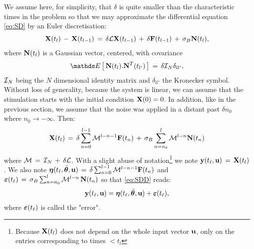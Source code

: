\documentclass{article}
\begin{document}
We assume here, for simplicity, that $\delta$ is quite smaller than the characteristic times in the problem so that we may approximate the differential equation \eqref{eq:SD} by an Euler discretisation:
%
$$
\bold{X}(t_l) \,-\, \bold{X}(t_{l-1})\,=\, \delta {\mathcal L} \bold{X}(t_{l-1}) \,+\, \delta \bold{F}(t_{l-1}) \,+\, \sigma_B \bold{N}(t_{l}),
$$
%
where $\bold{N}(t_{l})$ is a Gaussian vector, centered, with covariance
%
$$
\Exp{}{\vN(t_{l}).\vN^T(t_{l'})} \,=\, \delta \cI_N \delta_{l l'},
$$
%
${\mathcal I}_N$ being the $N$ dimensional identity matrix and $\delta_{ll'}$ the Kronecker symbol.
Without loss of generality, because the system is linear, we can assume that the stimulation starts with the initial condition $\bold{X}(0)=0$. In addition, like in the previous section, we assume that the noise was applied in a distant past $\delta n_0$ where $n_0 \to -\infty$. Then:
%
\begin{equation}\label{eq:SDD}
\bold{X}(t_l)  \,=\, \delta  \sum_{n=0}^{l-1} {\mathcal M}^{l-n-1} \bold{F}(t_n) \,+\, \sigma_B \sum_{n=n_0}^{l}  {\mathcal M}^{l-n} \bold{N}(t_{n})
\end{equation}
%
where ${\mathcal M} \,=\, {\mathcal I}_N \,+\, \delta {\mathcal L}$.
%
With a slight abuse of notation\footnote{Because $\bold{X}(t_l)$ does not depend on the whole input vector $\bold{u}$, only on the entries corresponding to times $< t_l$} we note $\mathbf{y}(t_\ell,\mathbf{u}) \,=\,\bold{X}(t_l)$. We also note $\boldsymbol{\eta}(t_\ell,\bar{\boldsymbol{\theta}},\mathbf{u}) \,=\, \delta  \sum_{n=0}^{l-1} {\mathcal M}^{l-n-1} \bold{F}(t_n)$ and $\boldsymbol{\varepsilon}(t_\ell) \,=\, \sigma_B \sum_{n=n_0}^{l}  {\mathcal M}^{l-n} \, \bold{N}(t_{n})$ so that \eqref{eq:SDD} reads:
%
\begin{equation}\label{eq:SDE}
\mathbf{y}(t_\ell,\mathbf{u}) = \boldsymbol{\eta}(t_\ell,\bar{\boldsymbol{\theta}},\mathbf{u})+\boldsymbol{\varepsilon}(t_\ell),
\end{equation}
%
where $\boldsymbol{\varepsilon}(t_\ell)$ is called the "error".
\end{document}
